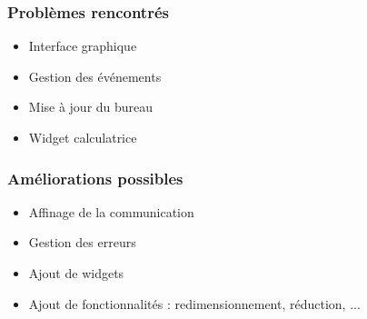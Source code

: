 \begin{frame}
	\frametitle{Problèmes rencontrés}
	\begin{itemize}
		\item Interface graphique
		\item Gestion des événements
		\item Mise à jour du bureau
		\item Widget calculatrice
	\end{itemize}

\end{frame}

\begin{frame}
	\frametitle{Améliorations possibles}
	\begin{itemize}
		\item Affinage de la communication
		\item Gestion des erreurs
		\item Ajout de widgets
		\item Ajout de fonctionnalités : redimensionnement, réduction, ...
	\end{itemize}

\end{frame}